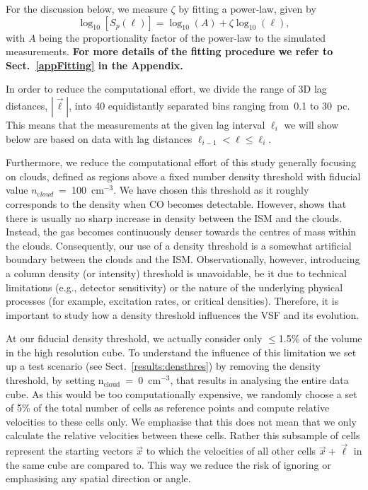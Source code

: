For the discussion below, we measure $\zeta$ by fitting a power-law,
given by
\begin{equation}
	\log_{10}\left[ S_p(\ell) \right] = \log_{10}\left(A\right) + \zeta \log_{10}(\ell) ,
	\label{equ:method:fitting}
\end{equation}
with $A$ being the proportionality factor of the power-law to the simulated measurements.
\textbf{For more details of the fitting procedure we refer to Sect.~\ref{appFitting} in the Appendix.}

In order to reduce the computational effort, we divide the range of 3D lag distances, $|\vec{\ell}|$, into 40 equidistantly separated bins ranging from~0.1 to 30~pc.
This means that the measurements at the given lag interval $\ell_i$ we will show below are based on data with lag distances $\ell_{i-1} < \ell \leq \ell_i$.

Furthermore, we reduce the computational effort of this study generally focusing on clouds, defined as regions above a fixed number density threshold with fiducial value $n_{\mathrm cloud}$~=~100~cm$^{-3}$.  We have chosen this threshold as it roughly corresponds to the density when CO becomes detectable.
However,  shows that there is usually no sharp increase in density between the ISM and the clouds. 
Instead, the gas becomes continuously denser towards the centres of mass within the clouds. 
Consequently, our use of a density threshold is a somewhat artificial boundary between the clouds and the ISM. Observationally, however, introducing a column density (or intensity) threshold is unavoidable, be it due to technical limitations (e.g., detector sensitivity) or the nature of the underlying physical processes (for example, excitation rates, or critical densities).
Therefore, it is important to study how a density threshold influences the VSF and its evolution.

At our fiducial density threshold, we actually consider only $\leq$1.5\% of the volume in the high resolution cube.
To understand the influence of this limitation we set up a test scenario (see Sect.~\ref{results:densthres}) by removing the density threshold, by setting n$_\mathrm{cloud}$~=~0~cm$^{-3}$, that results in analysing the entire data cube.
As this would be too computationally expensive, we randomly choose a set of 5\% of the total number of cells as reference points and compute relative velocities to these cells only.
We emphasise that this does not mean that we only calculate the relative velocities between these cells.
Rather this subsample of cells represent the starting vectors $\vec{x}$ to which the velocities of all other cells $\vec{x} + \vec{\ell}$ in the same cube are compared to.
This way we reduce the risk of ignoring or emphasising any spatial direction or angle.

